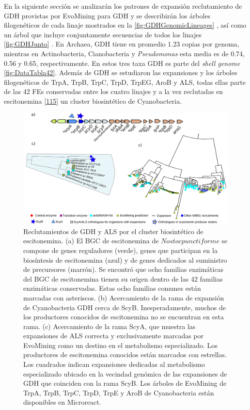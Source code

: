 \documentclass[12pt,twoside]{reedthesis}
\begin{document}
  En la siguiente sección se analizarán los patrones de expansión
  reclutamiento de GDH provistas por EvoMining para GDH y se describirán
  los árboles filogenéticos de cada linaje mostrados en la
  \autoref{fig:GDHGenomicLineages} , así como un árbol que incluye
  conjuntamente secuencias de todos los linajes \autoref{fig:GDHJunto} .
  En Archaea, GDH tiene en promedio 1.23 copias por genoma, mientras en
  Actinobacteria, Cianobacteria y \emph{Pseudomonas} esta media es de
  0.74, 0.56 y 0.65, respectivamente. En estos tres taxa GDH es parte del
  \emph{shell genome} \autoref{fig:DataTabla42}. Además de GDH se
  estudiaron las expansiones y los árboles filogenéticos de TrpA, TrpB,
  TrpC, TrpD, TrpEG, AroB y ALS, todas ellas parte de las 42 FEs
  conservadas entre los cuatro linajes y a la vez reclutadas en
  escitonemina
  {[}\protect\hyperlink{ref-balskus_investigating_2008}{115}{]} un cluster
  biosintético de Cyanobacteria.
  
  \begin{figure}[h!tbp]
  \centering
  \includegraphics[angle = 0,scale = .6]{chapter2/FigurasPaper/Figure5.pdf}
  \caption[Escitonemina es un reclutamiento en las ramas divergentes de las familias GDH y ALS]{\footnotesize{Reclutamientos de GDH y ALS por el cluster biosintético de escitonemina. (a) El BGC de  escitonemina de $Nostoc punctiforme$ se compone de genes reguladores (verde), genes que participan en la biosíntesis de escitonemina (azul) y de genes dedicados al suministro de precursores (marrón). Se encontró que ocho familias enzimáticas del BGC de escitonemina tienen su origen dentro de las 42 familias enzimáticas conservadas. Estas ocho familias comunes están marcadas con asteriscos. (b) Acercamiento de la rama de expansión de Cyanobacteria GDH cerca de ScyB. Inesperadamente, muchos de los productores conocidos de escitonemina no se encuentran en esta rama. (c) Acercamiento de la rama ScyA, que muestra las expansiones de ALS correcta y exclusivamente marcadas por EvoMining como un destino en el metabolismo especializado. Los productores de escitonemina conocidos están marcados con estrellas. Los cuadrados indican expansiones dedicadas al metabolismo especializado ubicado en la vecindad genómica de las expansiones de GDH que coinciden con la rama ScyB. Los árboles de EvoMining de TrpA, TrpB, TrpC, TrpD, TrpE y AroB de Cyanobacteria están disponibles en Microreact.}}
  \label{fig:Scytonemin}
  \end{figure}
  
\end{document}
